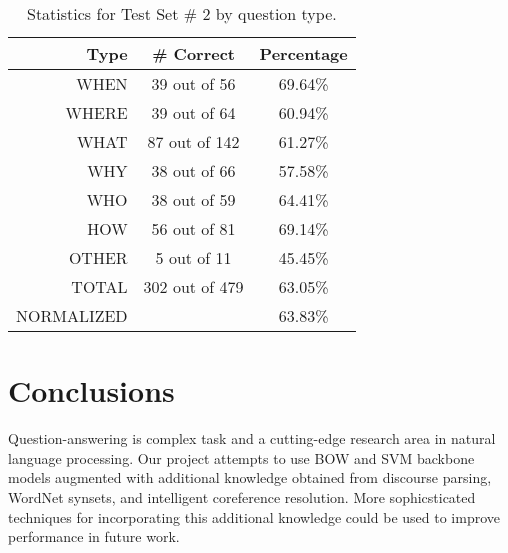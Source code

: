 \documentclass[11pt,letterpaper]{article}
\begin{document}
\begin{table}
\centering

	\begin{tabular}{|r|c|c|}
	\hline
	Type   & \# Correct & Percentage \\
	\hline
	\hline
	WHEN   &  39 out of   56 &  69.64\% \\
	\hline
	WHERE  &  39 out of   64 &  60.94\% \\
	\hline
	WHAT   &  87 out of  142 &  61.27\% \\
	\hline
	WHY    &  38 out of   66 &  57.58\% \\
	\hline
	WHO    &  38 out of   59 &  64.41\% \\
	\hline
	HOW    &  56 out of   81 &  69.14\% \\
	\hline
	OTHER  &   5 out of   11 &  45.45\% \\
	\hline
	\hline
	TOTAL  & 302 out of 479 &  63.05\% \\
	\tiny{NORMALIZED}  &  &  63.83\% \\
	\hline
	\end{tabular}

\caption{Statistics for Test Set \# 2 by question type.}
\label{table:question-types2}
\end{table}

%
%




\section{Conclusions}
\label{sec:conclusion}

Question-answering is complex task and a cutting-edge research area
in natural language processing. Our project attempts to use BOW and SVM backbone models augmented with additional knowledge obtained from discourse parsing, WordNet synsets, and intelligent coreference resolution. More sophicsticated techniques for incorporating this additional knowledge could be used to improve performance in future work.



%
%

%
 

%
\end{document}
